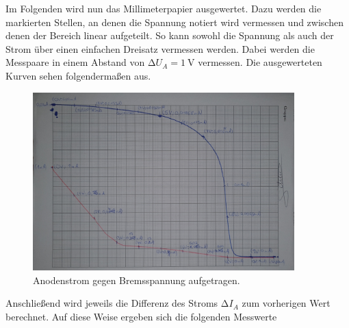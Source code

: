Im Folgenden wird nun das Millimeterpapier ausgewertet. Dazu werden die markierten Stellen, an denen die Spannung notiert wird vermessen und 
zwischen denen der Bereich linear aufgeteilt. So kann sowohl die Spannung als auch der Strom über einen einfachen Dreisatz vermessen werden.
Dabei werden die Messpaare in einem Abstand von $\increment U_A =\qty{1}{\volt}$ vermessen. Die ausgewerteten Kurven sehen folgendermaßen aus.

\begin{figure}[H]
    \centering
    \includegraphics[width=0.9\textwidth]{Bremsspannung.jpg}
    \caption{Anodenstrom gegen Bremsspannung aufgetragen.}
    \label{fig:Bremsspannung}
\end{figure}

\noindent Anschließend wird jeweils die Differenz des Stroms $\increment I_A$ zum vorherigen Wert berechnet.
Auf diese Weise ergeben sich die folgenden Messwerte


